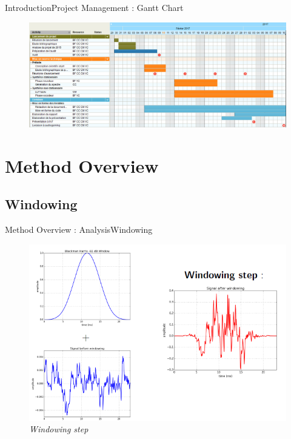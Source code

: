 \documentclass[10pt]{beamer}
\begin{document}
\begin{frame}{Introduction}{Project Management : Gantt Chart}

\begin{figure}
	\centerline{\includegraphics[scale=0.26]{Gantt.png}}
\end{figure}
\end{frame}

\section{Method Overview}
\subsection{Windowing}
\begin{frame}{Method Overview : Analysis}{Windowing}
\begin{figure}
	\centerline
	{\includegraphics[scale=0.4]{slide1.png}}
	\caption{\it Windowing step}
\end{figure}
\end{frame}
\end{document}

